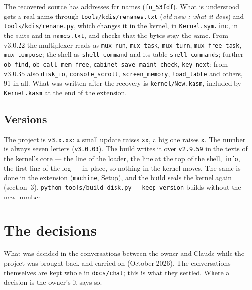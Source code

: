 \documentclass[11pt,a4paper]{article}
\newcommand{\file}[1]{\texttt{#1}}
\newcommand{\cmd}[1]{\texttt{#1}}
\begin{document}
The recovered source has addresses for names (\texttt{fn\_53fdf}). What is understood gets a real
name through \file{tools/kdis/renames.txt} (\emph{old new ; what it does}) and
\file{tools/kdis/rename.py}, which changes it in the kernel, in \file{Kernel.sym.inc}, in the
suits and in \file{names.txt}, and checks that the bytes stay the same. From v3.0.22 the
multiplexer reads as \texttt{mux\_run}, \texttt{mux\_task}, \texttt{mux\_turn},
\texttt{mux\_free\_task}, \texttt{mux\_compose}; the shell as \texttt{shell\_command} and its
table \texttt{shell\_commands}; further \texttt{ob\_find}, \texttt{ob\_call},
\texttt{mem\_free}, \texttt{cabinet\_save}, \texttt{maint\_check}, \texttt{key\_next}; from v3.0.35
also \texttt{disk\_io}, \texttt{console\_scroll}, \texttt{screen\_memory}, \texttt{load\_table}
and others, 91 in all. What was written after the recovery is \file{kernel/New.kasm}, included
by \file{Kernel.kasm} at the end of the extension.

\subsection{Versions}

The project is \texttt{v3.x.xx}: a small update raises \texttt{xx}, a big one raises \texttt{x}.
The number is always seven letters (\texttt{v3.0.03}). The build writes it over \texttt{v2.9.59} in
the texts of the kernel's core --- the line of the loader, the line at the top of the shell,
\cmd{info}, the first line of the log --- in place, so nothing in the kernel moves. The same is done in the extension (\cmd{machine}, Setup), and the build seals the kernel again
(section~3). \texttt{python tools/build\_disk.py -{}-keep-version} builds without the
new number.

\section{The decisions}\label{sec:decisions}

What was decided in the conversations between the owner and Claude while the project was
brought back and carried on (October 2026). The conversations themselves are kept whole in
\file{docs/chat}; this is what they settled. Where a decision is the owner's it says so.
\end{document}
